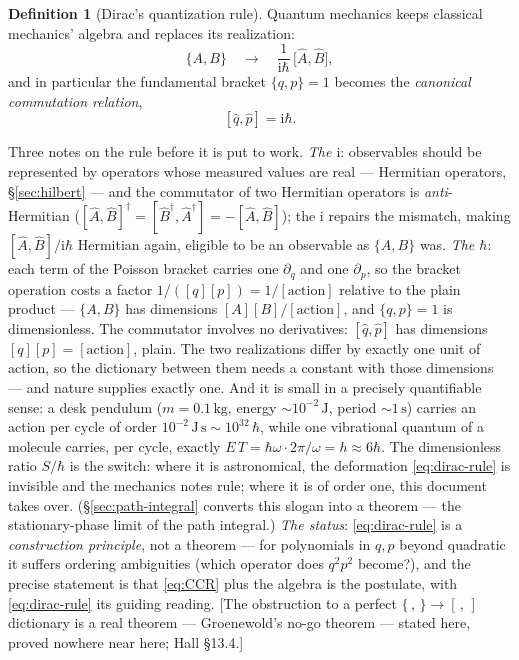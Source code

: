 \documentclass[11pt]{article}
\theoremstyle{plain}
\theoremstyle{definition}
\newtheorem{definition}[theorem]{Definition}
\theoremstyle{remark}
\newcommand{\ii}{\mathrm{i}}
\newcommand{\op}[1]{\hat{#1}}
\begin{document}
\begin{definition}[Dirac's quantization rule]\label{def:dirac-rule}
Quantum mechanics keeps classical mechanics' algebra and replaces
its realization:
\begin{equation}
  \boxed{\;
  \{A, B\}
  \quad\longrightarrow\quad
  \frac{1}{\ii\hbar}\,\bigl[\op A, \op B\bigr],
  \;}
  \label{eq:dirac-rule}
\end{equation}
and in particular the fundamental bracket $\{q, p\} = 1$ becomes the
\emph{canonical commutation relation},
\begin{equation}
  \boxed{\;
  [\op q, \op p] = \ii\hbar .
  \;}
  \label{eq:CCR}
\end{equation}
\end{definition}

\noindent
Three notes on the rule before it is put to work. \emph{The $\ii$}:
observables should be represented by operators whose measured values
are real --- Hermitian operators, \S\ref{sec:hilbert} --- and the
commutator of two Hermitian operators is \emph{anti}-Hermitian
($[\op A,\op B]^\dagger = [\op B^\dagger, \op A^\dagger] =
-[\op A, \op B]$); the $\ii$ repairs the mismatch, making
$[\op A,\op B]/\ii\hbar$ Hermitian again, eligible to be an
observable as $\{A,B\}$ was. \emph{The $\hbar$}: each term of
the Poisson bracket carries one $\partial_q$ and one $\partial_p$, so
the bracket operation costs a factor $1/([q][p]) = 1/[\text{action}]$
relative to the plain product --- $\{A, B\}$ has dimensions
$[A][B]/[\text{action}]$, and $\{q,p\} = 1$ is dimensionless. The
commutator involves no derivatives: $[\op q, \op p]$ has dimensions
$[q][p] = [\text{action}]$, plain. The two realizations differ by
exactly one unit of action, so the dictionary between them needs a
constant with those dimensions --- and nature supplies exactly one. And it is small in a
precisely quantifiable sense: a desk pendulum ($m = 0.1\,\mathrm{kg}$,
energy $\sim 10^{-2}\,\mathrm{J}$, period $\sim 1\,\mathrm{s}$)
carries an action per cycle of order $10^{-2}\,\mathrm{J\,s} \sim
10^{32}\,\hbar$, while one vibrational quantum of a molecule carries,
per cycle, exactly $E\,T = \hbar\omega \cdot 2\pi/\omega = h \approx
6\hbar$. The dimensionless ratio $S/\hbar$ is the switch: where it is
astronomical, the deformation \eqref{eq:dirac-rule} is invisible and
the mechanics notes rule; where it is of order one, this document
takes over. (\S\ref{sec:path-integral} converts this slogan into a
theorem --- the stationary-phase limit of the path integral.)
\emph{The status}: \eqref{eq:dirac-rule} is a \emph{construction
principle}, not a theorem --- for polynomials in $q, p$ beyond
quadratic it suffers ordering ambiguities (which operator does
$q^2p^2$ become?), and the precise statement is that
\eqref{eq:CCR} plus the algebra is the postulate, with
\eqref{eq:dirac-rule} its guiding reading. [The obstruction to a
perfect $\{\,,\,\} \to [\,,\,]$ dictionary is a real theorem ---
Groenewold's no-go theorem --- stated here, proved nowhere near here;
Hall \S13.4.]
\end{document}
